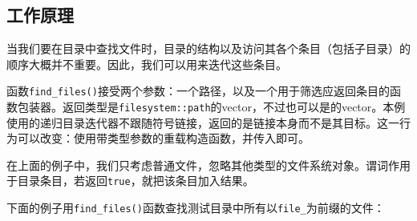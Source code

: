 
\subsection{工作原理}



当我们要在目录中查找文件时，目录的结构以及访问其各个条目（包括子目录）的顺序大概并不重要。因此，我们可以用来迭代这些条目。



函数\texttt{find\_\allowbreak{}files()}接受两个参数：一个路径，以及一个用于筛选应返回条目的函数包装器。返回类型是\texttt{filesystem::\allowbreak{}path}的vector，不过也可以是的vector。本例使用的递归目录迭代器不跟随符号链接，返回的是链接本身而不是其目标。这一行为可以改变：使用带类型参数的重载构造函数，并传入即可。



在上面的例子中，我们只考虑普通文件，忽略其他类型的文件系统对象。谓词作用于目录条目，若返回\texttt{true}，就把该条目加入结果。



下面的例子用\texttt{find\_\allowbreak{}files()}函数查找测试目录中所有以\texttt{file\_}为前缀的文件：



